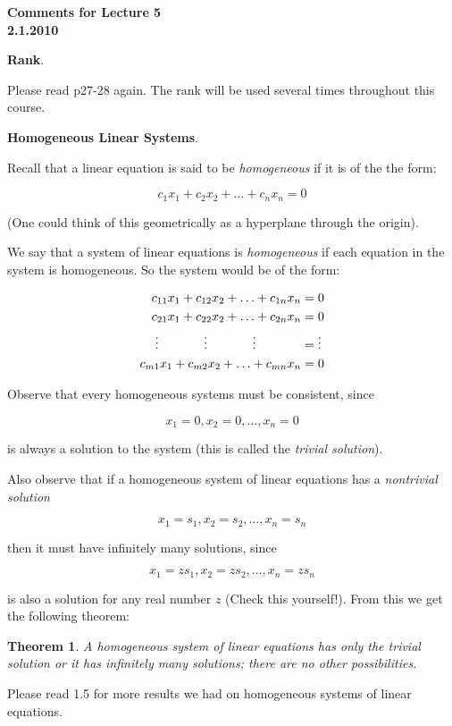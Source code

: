 \documentclass[12pt]{article}
\newtheorem*{thm}{Theorem}
\begin{document}
\begin{center}
{\large \bf Comments for Lecture 5}\\
\bf{2.1.2010}
\end{center}

\begin{center}
{\bf Rank}.  
\end{center}
\noindent Please read p27-28 again.  The rank will be used several times throughout this course.

\begin{center}
{\bf Homogeneous Linear Systems}.  
\end{center}

\noindent Recall that a linear equation is said to be {\it homogeneous} if it is of the the form:

\[ c_1 x_1 + c_2 x_2 + \ldots + c_n x_n = 0\]

\noindent (One could think of this geometrically as a hyperplane through the origin).

\noindent We say that a system of linear equations is {\it homogeneous} if each equation in the system is homogeneous.  So the system would be of the form:

\begin{align*}
c_{11} x_1 + c_{12} x_2 + \ldots + c_{1n} x_n &= 0 \\
c_{21} x_1 + c_{22} x_2 + \ldots + c_{2n} x_n &= 0 \\
\vdots \hspace{3pc} \vdots \hspace{3pc} \vdots \hspace{3pc} &= \vdots \\
c_{m1} x_1 + c_{m2} x_2 + \ldots + c_{mn} x_n &= 0 \\
\end{align*}

\noindent Observe that every homogeneous systems must be consistent, since

\[x_1 =0 , x_2=0, \ldots, x_n=0 \]

\noindent is always a solution to the system (this is called the {\it trivial solution}).

\noindent Also observe that if a homogeneous system of linear equations has a {\it nontrivial solution}

\[x_1 =s_1 , x_2=s_2, \ldots, x_n=s_n \]

\noindent then it must have infinitely many solutions, since

\[x_1 =z s_1 , x_2=z s_2, \ldots, x_n=z s_n \]

\noindent is also a solution for any real number $z$ (Check this yourself!).  From this we get the following theorem:

\begin{thm}  A homogeneous system of linear equations has only the trivial solution or it has infinitely many solutions; there are no other possibilities.
\end{thm}

\noindent Please read 1.5 for more results we had on homogeneous systems of linear equations.
\end{document}
